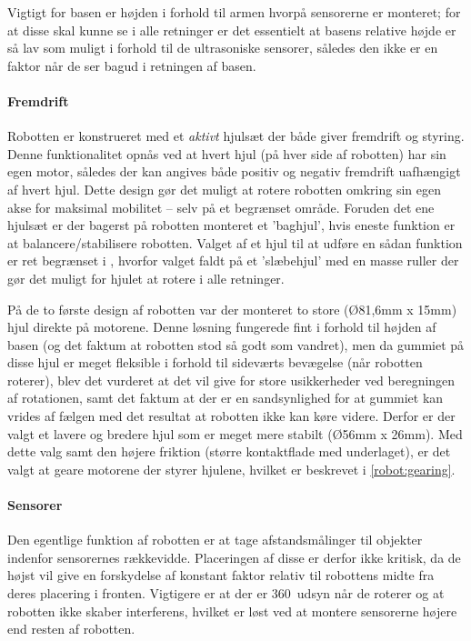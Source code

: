 Vigtigt for basen er højden i forhold til armen hvorpå sensorerne er monteret; for at disse skal kunne se i alle retninger er det essentielt at basens relative højde er så lav som muligt i forhold til de ultrasoniske sensorer, således den ikke er en faktor når de ser bagud i retningen af basen. 

\paragraph{Fremdrift}
Robotten er konstrueret med et \textit{aktivt} hjulsæt der både giver fremdrift og styring.
Denne funktionalitet opnås ved at hvert hjul (på hver side af robotten) har sin egen motor, således der kan angives både positiv og negativ fremdrift uafhængigt af hvert hjul.
Dette design gør det muligt at rotere robotten omkring sin egen akse for maksimal mobilitet -- selv på et begrænset område.
Foruden det ene hjulsæt er der bagerst på robotten monteret et 'baghjul', hvis eneste funktion er at balancere/stabilisere robotten.
Valget af et hjul til at udføre en sådan funktion er ret begrænset i \lego, hvorfor valget faldt på et 'slæbehjul' med en masse ruller der gør det muligt for hjulet at rotere i alle retninger.

På de to første design af robotten var der monteret to store (Ø81,6mm x 15mm) hjul direkte på motorene.
Denne løsning fungerede fint i forhold til højden af basen (og det faktum at robotten stod så godt som vandret), men da gummiet på disse hjul er meget fleksible i forhold til sideværts bevægelse (når robotten roterer), blev det vurderet at det vil give for store usikkerheder ved beregningen af rotationen, samt det faktum at der er en sandsynlighed for at gummiet kan vrides af fælgen med det resultat at robotten ikke kan køre videre.
Derfor er der valgt et lavere og bredere hjul som er meget mere stabilt (Ø56mm x 26mm).
Med dette valg samt den højere friktion (større kontaktflade med underlaget), er det valgt at geare motorene der styrer hjulene, hvilket er beskrevet i \cref{robot:gearing}.

\paragraph{Sensorer}
Den egentlige funktion af robotten er at tage afstandsmålinger til objekter indenfor sensorernes rækkevidde.
Placeringen af disse er derfor ikke kritisk, da de højst vil give en forskydelse af konstant faktor relativ til robottens midte fra deres placering i fronten.
Vigtigere er at der er 360\degree~udsyn når de roterer og at robotten ikke skaber interferens, hvilket er løst ved at montere sensorerne højere end resten af robotten. 





